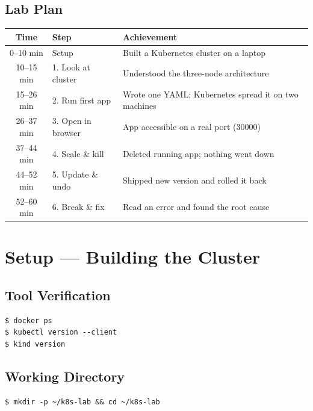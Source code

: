 \documentclass[12pt,a4paper]{report}
\begin{document}
\section*{Lab Plan}
\begin{center}
\begin{tabular}{cll}
\toprule
Time & Step & Achievement \\
\midrule
0--10 min  & Setup              & Built a Kubernetes cluster on a laptop \\
10--15 min & 1. Look at cluster  & Understood the three-node architecture \\
15--26 min & 2. Run first app    & Wrote one YAML; Kubernetes spread it on two machines \\
26--37 min & 3. Open in browser  & App accessible on a real port (30000) \\
37--44 min & 4. Scale \& kill    & Deleted running app; nothing went down \\
44--52 min & 5. Update \& undo   & Shipped new version and rolled it back \\
52--60 min & 6. Break \& fix     & Read an error and found the root cause \\
\bottomrule
\end{tabular}
\end{center}

\clearpage

\chapter*{Setup --- Building the Cluster}

\section*{Tool Verification}
\begin{lstlisting}
$ docker ps
$ kubectl version --client
$ kind version
\end{lstlisting}

\section*{Working Directory}
\begin{lstlisting}
$ mkdir -p ~/k8s-lab && cd ~/k8s-lab
\end{lstlisting}
\end{document}
